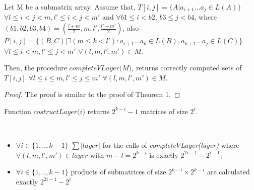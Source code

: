 \begin{theorem}
Let M be a submatrix array. Assume that, $T[i, j] =  \{ A |  a_{i + 1} \dots a_{j} \in L(A)\}$ $\forall l \leq i < j < m,  l' \leq i < j < m'$ and $\forall b1 \leq i < b2$,  $b3 \leq j < b4$, where $(b1, b2, b3, b4) = (\frac{l+m}{2}, m, l', \frac{l'+m'}{2})$, also $P[i, j] =  \{ (B, C) |\exists (m \le k < l'): a_{i + 1} \dots a_{k} \in L(B), a_{k + 1} \dots a_{j} \in L(C)\}$ $\forall l \leq i < m,  l' \leq j < m'$ $\forall (l, m, l', m') \in M$.

Then, the procedure $\textit{completeVLayer(M)}$, returns correctly computed sets of $T[i, j]$ $\forall l \leq i \le m,  l' \leq j \le m'$ $\forall (l, m, l', m') \in M$.
\end{theorem}

\begin{proof}
The proof is similar to the proof of Theorem 1.
\end{proof}

\begin{note}
Function $\textit{costructLayer(i)}$ returns $2^{k - i} - 1$ matrices of size $2^i$.
\end{note}

\begin{lemma}
\
\begin{itemize}
 \item $\forall i \in \{ 1, .., k - 1\}$  $\sum{|layer|}$ for the calls of \textit{completeVLayer(layer)} where $\forall (l, m, l', m') \in layer$ with $m - l = 2^{k - i}$  is exactly $2^{2i - 1} - 2^{i - 1}$;
 \item $\forall i \in \{ 1, .., k - 1\}$ products of submatrices of size $2^{k - i} \times 2^{k - i}$ are calculated exactly $2^{2i - 1} - 2^{i}$
\end{itemize}
\end{lemma}


